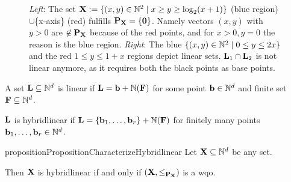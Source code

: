 \begin{figure}[h!]
\begin{minipage}{4.5cm}
\end{minipage}%

\caption{\textit{Left}: The set \(\mathbf{X}:=\{(x,y) \in \mathbb{N}^2 \mid x \geq y \geq \log_2(x+1)\}\) (blue region) \(\cup \)\{x-axis\} (red) fulfills \(\operatorname{\mathbf{P}_{\mathbf{X}}}=\{\mathbf{0}\}\). Namely vectors \((x,y)\) with \(y>0\) are \(\not \in \operatorname{\mathbf{P}_{\mathbf{X}}}\) because of the red points, and for \(x>0, y=0\) the reason is the blue region.  \newline
\textit{Right}: The blue \(\{(x,y) \in \mathbb{N}^2 \mid 0 \leq y \leq 2x\}\) and the red \(1 \leq y \leq 1+x\) regions depict linear sets. \(\mathbf{L}_1 \cap \mathbf{L}_2\) is not linear anymore, as it requires both the black points as base points.}\label{FigureIntuitionCones}
\end{figure}

\begin{definition}
A set \(\mathbf{L} \subseteq \mathbb{N}^d\) is linear if \(\mathbf{L}=\mathbf{b}+\mathbb{N}(\mathbf{F})\) for some point \(\mathbf{b} \in \mathbb{N}^d\) and finite set \(\mathbf{F}\subseteq \mathbb{N}^d\). 

\(\mathbf{L}\) is hybridlinear if \(\mathbf{L}=\{\mathbf{b}_1, \dots, \mathbf{b}_r\}+\mathbb{N}(\mathbf{F})\) for finitely many points \(\mathbf{b}_1, \dots, \mathbf{b}_r \in \mathbb{N}^d\).
\end{definition}

\begin{restatable}{proposition}{PropositionCharacterizeHybridlinear}
Let \(\mathbf{X}\subseteq \mathbb{N}^d\) be any set. 

Then \(\mathbf{X}\) is hybridlinear if and only if \((\mathbf{X}, \leq_{\operatorname{\mathbf{P}_{\mathbf{X}}}})\) is a wqo. \label{PropositionCharacterizeHybridlinear}
\end{restatable}

